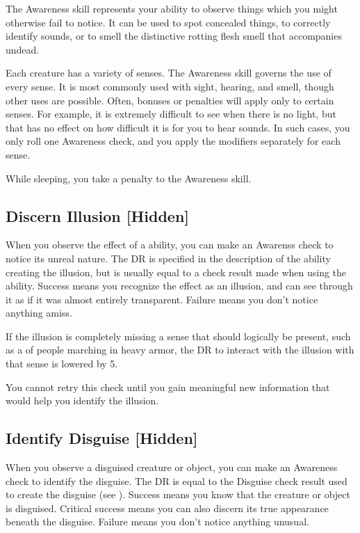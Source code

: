 \newpage
{}
    The Awareness skill represents your ability to observe things which you might otherwise fail to notice. It can be used to spot concealed things, to correctly identify sounds, or to smell the distinctive rotting flesh smell that accompanies undead.

    Each creature has a variety of senses. The Awareness skill governs the use of every sense. It is most commonly used with sight, hearing, and smell, though other uses are possible. Often, bonuses or penalties will apply only to certain senses. For example, it is extremely difficult to see when there is no light, but that has no effect on how difficult it is for you to hear sounds. In such cases, you only roll one Awareness check, and you apply the modifiers separately for each sense.

    While sleeping, you take a  penalty to the Awareness skill.

    \subsection{Discern Illusion [Hidden]}
        When you observe the effect of a  ability, you can make an Awarenss check to notice its unreal nature.
        The DR is specified in the description of the ability creating the illusion, but is usually equal to a check result made when using the ability.
        Success means you recognize the effect as an illusion, and can see through it as if it was almost entirely transparent.
        Failure means you don't notice anything amiss.

        If the illusion is completely missing a sense that should logically be present, such as a  of people marching in heavy armor, the DR to interact with the illusion with that sense is lowered by 5.

        You cannot retry this check until you gain meaningful new information that would help you identify the illusion.

    \subsection{Identify Disguise [Hidden]}\label{Identify Disguise}
        When you observe a disguised creature or object, you can make an Awareness check to identify the disguise.
        The DR is equal to the Disguise check result used to create the disguise (see ).
        Success means you know that the creature or object is disguised.
        Critical success means you can also discern its true appearance beneath the disguise.
        Failure means you don't notice anything unusual.

